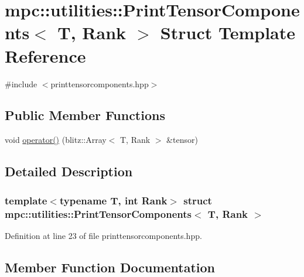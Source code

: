 \hypertarget{structmpc_1_1utilities_1_1_print_tensor_components}{}\section{mpc\+:\+:utilities\+:\+:Print\+Tensor\+Components$<$ T, Rank $>$ Struct Template Reference}
\label{structmpc_1_1utilities_1_1_print_tensor_components}


{\ttfamily \#include $<$printtensorcomponents.\+hpp$>$}

\subsection*{Public Member Functions}
\begin{DoxyCompactItemize}
\item 
void \mbox{\hyperlink{structmpc_1_1utilities_1_1_print_tensor_components_aff591b182c9d278a33738e18116382e2}{operator()}} (blitz\+::\+Array$<$ T, Rank $>$ \&tensor)
\end{DoxyCompactItemize}


\subsection{Detailed Description}
\subsubsection*{template$<$typename T, int Rank$>$\newline
struct mpc\+::utilities\+::\+Print\+Tensor\+Components$<$ T, Rank $>$}



Definition at line 23 of file printtensorcomponents.\+hpp.



\subsection{Member Function Documentation}
\mbox{\label{structmpc_1_1utilities_1_1_print_tensor_components_aff591b182c9d278a33738e18116382e2}} 
